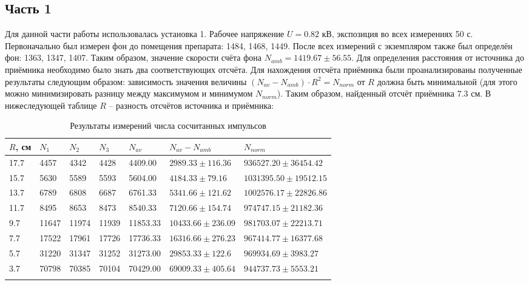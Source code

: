 \documentclass[12pt,a4paper]{article}
\begin{document}
	\subsection{Часть 1}
	Для данной части работы использовалась установка 1. Рабочее напряжение $U = 0.82$ кВ, экспозиция во всех измерениях 50 с. Первоначально был измерен фон до помещения препарата: 1484, 1468, 1449. После всех измерений с экземпляром также был определён фон: 1363, 1347, 1407. Таким образом, значение скорости счёта фона $N_{amb} = 1419.67\pm56.55$. Для определения расстояния от источника до приёмника необходимо было знать два соответствующих отсчёта. Для нахождения отсчёта приёмника были проанализированы полученные результаты следующим образом: зависимость значения величины $(N_{av} - N_{amb}) \cdot R^2 = N_{norm}$ от $R$ должна быть минимальной (для этого можно минимизировать разницу между максимумом и минимумом $ N_{norm}$). Таким образом, найденный отсчёт приёмника 7.3 см. В нижеследующей таблице $R$ -- разность отсчётов источника и приёмника:
	{\footnotesize
	\begin{longtable}{| l | l | l | l | l | l | l |}
		\hline
		$R$, см	& $N_1$	&	$N_2$	&	$N_3$	&	$N_{av}$	&	$N_{av} - N_{amb}$	&	$N_{norm}$					\\
		\hline
		17.7		& 4457		&	4342	&	4428	&	4409.00	&	$2989.33\pm116.36$	&	$936527.20\pm36454.42$		\\
		15.7		& 5630		&	5589	&	5593	&	5604.00	&	$4184.33\pm79.16$	&	$1031395.50\pm19512.15$	\\
		13.7		& 6789		&	6808	&	6687	&	6761.33	&	$5341.66\pm121.62$	&	$1002576.17\pm22826.86$	\\
		11.7		& 8495		&	8653	&	8473	&	8540.33	&	$7120.66\pm154.74$	&	$974747.15\pm21182.36$		\\
		9.7			& 11647	&	11974	&	11939	&	11853.33	&	$10433.66\pm236.09$	&	$981703.07\pm22213.71$		\\
		7.7			& 17522	&	17961	&	17726	&	17736.33	&	$16316.66\pm276.23$	&	$967414.77\pm16377.68$		\\
		5.7			& 31220	&	31347	&	31252	&	31273.00	&	$29853.33\pm122.6$	&	$969934.69\pm3983.27$		\\
		3.7			& 70798	&	70385	&	70104	&	70429.00	&	$69009.33\pm405.64$	&	$944737.73\pm5553.21$		\\
		\hline
	\caption{Результаты измерений числа сосчитанных импульсов} \label{tab:tab1}
	\end{longtable}}
\end{document}
